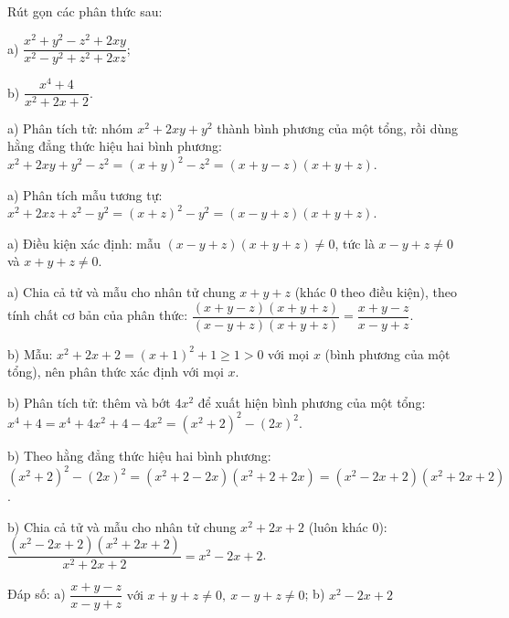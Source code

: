 \begin{problem}[8DS-PS-029]
Rút gọn các phân thức sau:

a) $\dfrac{x^2 + y^2 - z^2 + 2xy}{x^2 - y^2 + z^2 + 2xz}$;

b) $\dfrac{x^4 + 4}{x^2 + 2x + 2}$.

\begin{solution}
a) Phân tích tử: nhóm $x^2 + 2xy + y^2$ thành bình phương của một tổng, rồi dùng hằng đẳng thức hiệu hai bình phương: $x^2 + 2xy + y^2 - z^2 = (x + y)^2 - z^2 = (x + y - z)(x + y + z)$.

a) Phân tích mẫu tương tự: $x^2 + 2xz + z^2 - y^2 = (x + z)^2 - y^2 = (x - y + z)(x + y + z)$.

a) Điều kiện xác định: mẫu $(x - y + z)(x + y + z) \neq 0$, tức là $x - y + z \neq 0$ và $x + y + z \neq 0$.

a) Chia cả tử và mẫu cho nhân tử chung $x + y + z$ (khác $0$ theo điều kiện), theo tính chất cơ bản của phân thức: $\dfrac{(x + y - z)(x + y + z)}{(x - y + z)(x + y + z)} = \dfrac{x + y - z}{x - y + z}$.

b) Mẫu: $x^2 + 2x + 2 = (x + 1)^2 + 1 \geq 1 > 0$ với mọi $x$ (bình phương của một tổng), nên phân thức xác định với mọi $x$.

b) Phân tích tử: thêm và bớt $4x^2$ để xuất hiện bình phương của một tổng: $x^4 + 4 = x^4 + 4x^2 + 4 - 4x^2 = (x^2 + 2)^2 - (2x)^2$.

b) Theo hằng đẳng thức hiệu hai bình phương: $(x^2 + 2)^2 - (2x)^2 = (x^2 + 2 - 2x)(x^2 + 2 + 2x) = (x^2 - 2x + 2)(x^2 + 2x + 2)$.

b) Chia cả tử và mẫu cho nhân tử chung $x^2 + 2x + 2$ (luôn khác $0$): $\dfrac{(x^2 - 2x + 2)(x^2 + 2x + 2)}{x^2 + 2x + 2} = x^2 - 2x + 2$.

Đáp số: a) $\boxed{\dfrac{x + y - z}{x - y + z} \text{ với } x + y + z \neq 0,\ x - y + z \neq 0}$; b) $\boxed{x^2 - 2x + 2}$
\end{solution}
\end{problem}

